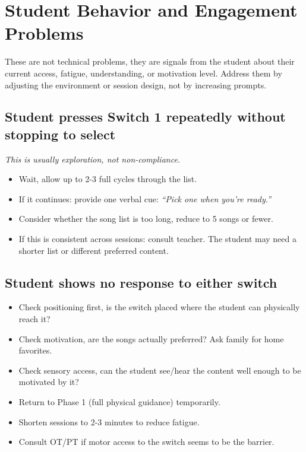\documentclass[justified,openright]{tufte-book}
\begin{document}
\section{Student Behavior and Engagement
Problems}\label{student-behavior-and-engagement-problems}


These are not technical problems, they are signals from the student
about their current access, fatigue, understanding, or motivation level.
Address them by adjusting the environment or session design, not by
increasing prompts.


\subsection{Student presses Switch 1 repeatedly without stopping to
select}\label{student-presses-switch-1-repeatedly-without-stopping-to-select}

\emph{This is usually exploration, not non-compliance.}

\begin{itemize}

\item
  Wait, allow up to 2-3 full cycles through the list.
\item
  If it continues: provide one verbal cue: \emph{``Pick one when you're
  ready.''}
\item
  Consider whether the song list is too long, reduce to 5 songs or
  fewer.
\item
  If this is consistent across sessions: consult teacher. The student
  may need a shorter list or different preferred content.
\end{itemize}

\subsection{Student shows no response to either
switch}\label{student-shows-no-response-to-either-switch}

\begin{itemize}

\item
  Check positioning first, is the switch placed where the student can
  physically reach it?
\item
  Check motivation, are the songs actually preferred? Ask family for
  home favorites.
\item
  Check sensory access, can the student see/hear the content well
  enough to be motivated by it?
\item
  Return to Phase 1 (full physical guidance) temporarily.
\item
  Shorten sessions to 2-3 minutes to reduce fatigue.
\item
  Consult OT/PT if motor access to the switch seems to be the barrier.
\end{itemize}
\end{document}

